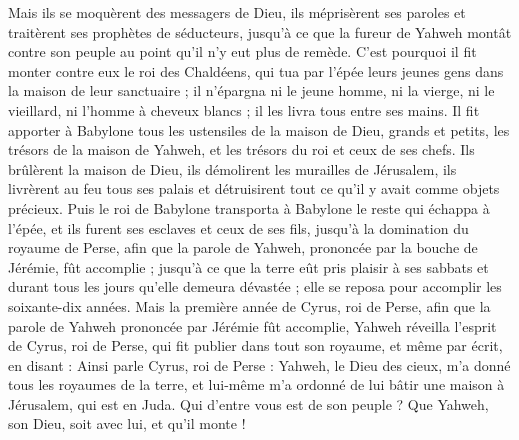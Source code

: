 \begin{multicols}{2}
Mais ils se moquèrent des messagers de Dieu, ils méprisèrent ses paroles et traitèrent ses prophètes de séducteurs, jusqu'à ce que la fureur de Yahweh montât contre son peuple au point qu'il n'y eut plus de remède.
C'est pourquoi il fit monter contre eux le roi des Chaldéens, qui tua par l'épée leurs jeunes gens dans la maison de leur sanctuaire ; il n'épargna ni le jeune homme, ni la vierge, ni le vieillard, ni l'homme à cheveux blancs ; il les livra tous entre ses mains.
Il fit apporter à Babylone tous les ustensiles de la maison de Dieu, grands et petits, les trésors de la maison de Yahweh, et les trésors du roi et ceux de ses chefs.
Ils brûlèrent la maison de Dieu, ils démolirent les murailles de Jérusalem, ils livrèrent au feu tous ses palais et détruisirent tout ce qu'il y avait comme objets précieux.
Puis le roi de Babylone transporta à Babylone le reste qui échappa à l'épée, et ils furent ses esclaves et ceux de ses fils, jusqu'à la domination du royaume de Perse,
afin que la parole de Yahweh, prononcée par la bouche de Jérémie, fût accomplie ; jusqu'à ce que la terre eût pris plaisir à ses sabbats et durant tous les jours qu'elle demeura dévastée ; elle se reposa pour accomplir les soixante-dix années.
Mais la première année de Cyrus, roi de Perse, afin que la parole de Yahweh prononcée par Jérémie fût accomplie, Yahweh réveilla l'esprit de Cyrus, roi de Perse, qui fit publier dans tout son royaume, et même par écrit, en disant :
Ainsi parle Cyrus, roi de Perse : Yahweh, le Dieu des cieux, m'a donné tous les royaumes de la terre, et lui-même m'a ordonné de lui bâtir une maison à Jérusalem, qui est en Juda. Qui d'entre vous est de son peuple ? Que Yahweh, son Dieu, soit avec lui, et qu'il monte !
\PPE{}
\end{multicols}

